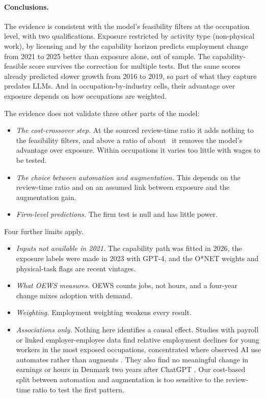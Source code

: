 \paragraph{Conclusions.} The evidence is consistent with the model's feasibility filters at the occupation level, with two qualifications. Exposure restricted by activity type (non-physical work), by licensing and by the capability horizon predicts employment change from 2021 to 2025 better than exposure alone, out of sample. The capability-feasible score survives the correction for multiple tests. But the same scores already predicted slower growth from 2016 to 2019, so part of what they capture predates LLMs. And in occupation-by-industry cells, their advantage over exposure depends on how occupations are weighted.

The evidence does not validate three other parts of the model:
\begin{itemize}
\item \emph{The cost-crossover step.} At the sourced review-time ratio it adds nothing to the feasibility filters, and above a ratio of about \btRhoStarCv\ it removes the model's advantage over exposure. Within occupations it varies too little with wages to be tested.
\item \emph{The choice between automation and augmentation.} This depends on the review-time ratio and on an assumed link between exposure and the augmentation gain.
\item \emph{Firm-level predictions.} The firm test is null and has little power.
\end{itemize}

Four further limits apply.
\begin{itemize}
\item \emph{Inputs not available in 2021.} The capability path was fitted in 2026, the exposure labels were made in 2023 with GPT-4, and the O*NET weights and physical-task flags are recent vintages.
\item \emph{What OEWS measures.} OEWS counts jobs, not hours, and a four-year change mixes adoption with demand.
\item \emph{Weighting.} Employment weighting weakens every result.
\item \emph{Associations only.} Nothing here identifies a causal effect. Studies with payroll or linked employer-employee data find relative employment declines for young workers in the most exposed occupations, concentrated where observed AI use automates rather than augments \citep{brynjolfsson2025canaries}. They also find no meaningful change in earnings or hours in Denmark two years after ChatGPT \citep{humlum2025still}. Our cost-based split between automation and augmentation is too sensitive to the review-time ratio to test the first pattern.
\end{itemize}
